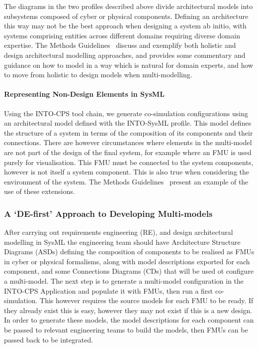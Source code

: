 The diagrams in the two profiles described above divide architectural models into subsystems composed of cyber or physical components. Defining an architecture this way may not be the best approach when designing a system ab initio, with systems comprising entities across different domains requiring diverse domain expertise. The Methods Guidelines~\cite{Pierce&18} discuss and exemplify both holistic and design architectural modelling approaches, and provides some commentary and guidance on how to model in a way which is natural for domain experts, and how to move from holistic to design models when multi-modelling.


\paragraph{Representing Non-Design Elements in SysML}
\label{sec:sysml:non-design}

Using the INTO-CPS tool chain, we generate co-simulation configurations using an architectural model defined with the INTO-SysML profile. This model defines the structure of a system in terms of the composition of its components and their connections. There are however circumstances where elements in the multi-model are not part of the design of the final system, for example where an FMU is used purely for visualisation. This FMU must be connected to the system components, however is not itself a system component. This is also true when considering the environment of the system. The Methods Guidelines~\cite{Pierce&18} present an example of the use of these extensions.

\subsubsection{A `DE-first' Approach to Developing Multi-models}

After carrying out requirements engineering (RE), and design architectural modelling in SysML the engineering team should have  Architecture Structure Diagrams (ASDs) defining the composition of components to be realised as FMUs in cyber or physical formalisms, along with model descriptions exported for each component, and some Connections Diagrams (CDs) that will be used ot configure a multi-model. The next step is to generate a multi-model configuration in the INTO-CPS Application and populate it with FMUs, then run a first co-simulation. This however requires the source models for each FMU to be ready. If they already exist this is easy, however they may not exist if this is a new design. In order to generate these models, the model descriptions for each component can be passed to relevant engineering teams to build the models, then FMUs can be passed back to be integrated.

